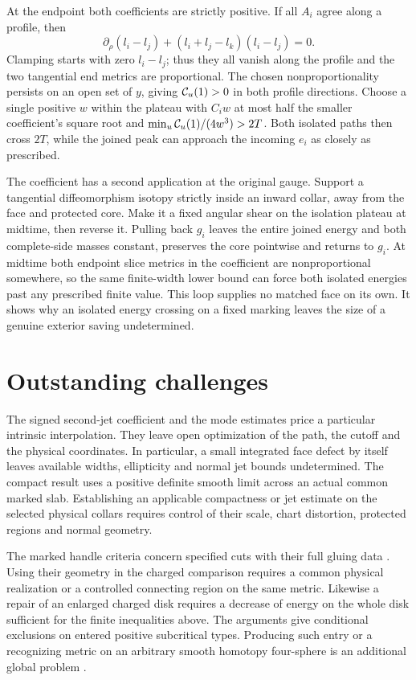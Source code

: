 \documentclass[11pt,letterpaper]{article}
\numberwithin{equation}{section}
\begin{document}
At the endpoint both coefficients are strictly positive. If all
\(A_i\) agree along a profile, then
\[
 \partial_\rho(l_i-l_j)+(l_i+l_j-l_k)(l_i-l_j)=0 .
\]
Clamping starts with zero \(l_i-l_j\); thus they all vanish along
the profile and the two tangential end metrics are proportional.
The chosen nonproportionality persists on an open set of \(y\),
giving \({\cal C}_u(1)>0\) in both profile directions. Choose a
single positive \(w\) within the plateau with \(C_iw\) at most
half the smaller coefficient's square root and
\(\min_u{\cal C}_u(1)/(4w^3)>2T\).
Both isolated paths then cross \(2T\), while the joined peak
can approach the incoming \(e_i\) as closely as prescribed.

The coefficient has a second application at the original gauge.
Support a tangential diffeomorphism isotopy strictly inside an
inward collar, away from the face and protected core. Make it a
fixed angular shear on the isolation plateau at midtime, then
reverse it. Pulling back \(g_i\) leaves the entire joined energy
and both complete-side masses constant, preserves the core
pointwise and returns to \(g_i\). At midtime both endpoint
slice metrics in the coefficient are nonproportional somewhere,
so the same finite-width lower bound can force both isolated
energies past any prescribed finite value. This loop supplies no
matched face on its own. It shows why an isolated energy crossing
on a fixed marking leaves the size of a genuine exterior saving
undetermined.

\section{Outstanding challenges}

The signed second-jet coefficient and the mode estimates price a
particular intrinsic interpolation. They leave open optimization of
the path, the cutoff and the physical coordinates. In particular,
a small integrated face defect by itself leaves available widths,
ellipticity and normal jet bounds undetermined. The compact result
uses a positive definite smooth limit across an actual common marked
slab. Establishing an applicable compactness or jet estimate on the
selected physical collars requires control of their scale, chart
distortion, protected regions and normal geometry.

The marked handle criteria concern specified cuts with their full
gluing data \cite{Baker2026HandleCuts}. Using their geometry in
the charged comparison requires a common physical realization or a
controlled connecting region on the same metric. Likewise a repair
of an enlarged charged disk requires a decrease of energy on the
whole disk sufficient for the finite inequalities above. The
arguments give conditional exclusions on entered positive subcritical
types. Producing such entry or a recognizing metric on an arbitrary
smooth homotopy four-sphere is an additional global problem
\cite{Baker2026CollarProgram,Baker2026ChiralMaster}.



\end{document}
